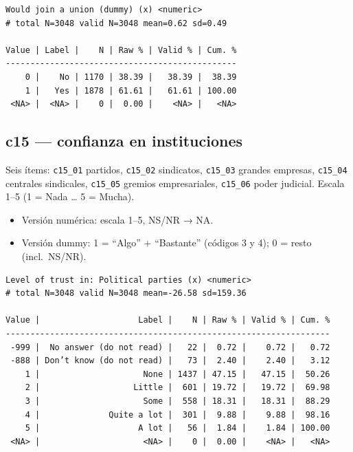 \documentclass[
  letterpaper,
  DIV=11,
  numbers=noendperiod]{scrreprt}
\newenvironment{Shaded}{\begin{snugshade}}{\end{snugshade}}
\newcommand{\FunctionTok}[1]{\textcolor[rgb]{0.28,0.35,0.67}{#1}}
\newcommand{\NormalTok}[1]{\textcolor[rgb]{0.00,0.23,0.31}{#1}}
\newcommand{\SpecialCharTok}[1]{\textcolor[rgb]{0.37,0.37,0.37}{#1}}
\providecommand{\tightlist}{%
  \setlength{\itemsep}{0pt}\setlength{\parskip}{0pt}}
\begin{document}
\begin{Shaded}
\end{Shaded}

\begin{verbatim}
Would join a union (dummy) (x) <numeric> 
# total N=3048 valid N=3048 mean=0.62 sd=0.49

Value | Label |    N | Raw % | Valid % | Cum. %
-----------------------------------------------
    0 |    No | 1170 | 38.39 |   38.39 |  38.39
    1 |   Yes | 1878 | 61.61 |   61.61 | 100.00
 <NA> |  <NA> |    0 |  0.00 |    <NA> |   <NA>
\end{verbatim}

\subsection{c15 --- confianza en
instituciones}\label{c15-confianza-en-instituciones}

Seis ítems: \texttt{c15\_01} partidos, \texttt{c15\_02} sindicatos,
\texttt{c15\_03} grandes empresas, \texttt{c15\_04} centrales
sindicales, \texttt{c15\_05} gremios empresariales, \texttt{c15\_06}
poder judicial. Escala 1--5 (1 = Nada \ldots{} 5 = Mucha).

\begin{itemize}
\tightlist
\item
  Versión numérica: escala 1--5, NS/NR → NA.
\item
  Versión dummy: 1 = ``Algo'' + ``Bastante'' (códigos 3 y 4); 0 = resto
  (incl.~NS/NR).
\end{itemize}

\begin{Shaded}
\end{Shaded}

\begin{verbatim}
Level of trust in: Political parties (x) <numeric> 
# total N=3048 valid N=3048 mean=-26.58 sd=159.36

Value |                    Label |    N | Raw % | Valid % | Cum. %
------------------------------------------------------------------
 -999 |  No answer (do not read) |   22 |  0.72 |    0.72 |   0.72
 -888 | Don’t know (do not read) |   73 |  2.40 |    2.40 |   3.12
    1 |                     None | 1437 | 47.15 |   47.15 |  50.26
    2 |                   Little |  601 | 19.72 |   19.72 |  69.98
    3 |                     Some |  558 | 18.31 |   18.31 |  88.29
    4 |              Quite a lot |  301 |  9.88 |    9.88 |  98.16
    5 |                    A lot |   56 |  1.84 |    1.84 | 100.00
 <NA> |                     <NA> |    0 |  0.00 |    <NA> |   <NA>
\end{verbatim}
\end{document}
